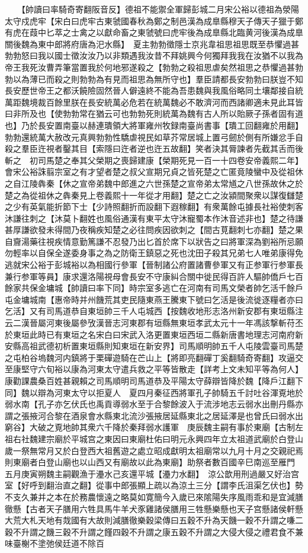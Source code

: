 　　【帥讀曰率騎奇寄翻阪音反】德祖不能禦全軍歸彭城二月宋公裕以德祖為滎陽太守戍虎牢【宋白曰虎牢古東虢國春秋為鄭之制邑漢為成臯縣穆天子傳天子獵于鄭有虎在葭中匕萃之士禽之以獻命畜之東虢號曰虎牢後為成臯縣北臨黄河後漢為成臯關後魏為東中郎將府唐為汜水縣】　夏主勃勃徵隱士京兆韋祖思祖思既至恭懼過甚勃勃怒曰我以國士徵汝汝乃以非類遇我汝昔不拜姚興今何獨拜我我在汝猶不以我為帝王我死汝曹弄筆當置我於何地邪遂殺之【勃勃之殺祖思虐矣然祖思之恭懼過甚勃勃以為薄已而殺之則勃勃為有見而祖思為無所守也】羣臣請都長安勃勃曰朕豈不知長安歷世帝王之都沃饒險固然晉人僻遠終不能為吾患魏與我風俗略同土壤鄰接自統萬距魏境裁百餘里朕在長安統萬必危若在統萬魏必不敢濟河而西諸卿適未見此耳皆曰非所及也【使勃勃常在猶云可也勃勃死則統萬為魏有古人所以貽厥子孫者固有道也】乃於長安置南臺以赫連璝領大將軍雍州牧録南臺尚書事【璝工回翻雍於用翻】勃勃還統萬大赦改元真興勃勃性驕虐視民如草芥常居城上置弓劒於側有所嫌忿手自殺之羣臣迕視者鑿其目【索隱曰迕者逆也迕五故翻】笑者決其脣諫者先截其舌而後斬之　初司馬楚之奉其父榮期之喪歸建康【榮期死見一百一十四卷安帝義熙二年】會宋公裕誅翦宗室之有才望者楚之叔父宣期兄貞之皆死楚之亡匿竟陵蠻中及從祖休之自江陵犇秦【休之宣帝弟魏中郎進之六世孫楚之宣帝弟太常馗之八世孫故休之於楚之為從祖休之犇秦見上卷義熙十一年從才用翻】楚之亡之汝潁間聚衆以謀復讎楚之少有英氣能折節下士【少詩照翻折而設翻下遐稼翻】有衆萬餘屯據長社裕使刺客沐謙往刺之【沐莫卜翻姓也風俗通漢有東平太守沐寵蜀本作沐音述非也】楚之待謙甚厚謙欲發未得間乃夜稱疾知楚之必往問疾因欲刺之【間古莧翻刺七亦翻】楚之果自齎湯藥往視疾情意勤篤謙不忍發乃出匕首於席下以狀告之曰將軍深為劉裕所忌願勿輕率以自保全遂委身事之為之防衛王鎮惡之死也沈田子殺其兄弟七人唯弟康得免逃就宋公裕于彭城裕以為相國行參軍【晉制諸公府置諸曹參軍又有正参軍行参軍長兼行参軍等員】康求還洛陽視母會長安不守康糾合關中徙民得百許人驅帥僑戶七百餘家共保金墉城【帥讀曰率下同】時宗室多逃亡在河南有司馬文榮者帥乞活千餘戶屯金墉城南【惠帝時并州饑荒其吏民隨東燕王騰東下號曰乞活是後流徙逐糧者亦曰乞活】又有司馬道恭自東垣帥三千人屯城西【按魏收地形志洛州新安郡有東垣縣注云二漢晉屬河東後屬參攷漢晉志河東郡有垣縣無東垣孝武太元十一年馮該撃斬苻丕於東垣此時已有東垣之名宋白曰宋武入洛更置東垣西垣二縣新唐書地理志河南府新安縣高祖武德初析置東垣縣則知東垣在新安界】司馬順明帥五千人屯陵雲臺司馬楚之屯柏谷塢魏河内鎮將于栗磾遊騎在芒山上【將即亮翻磾丁奚翻騎奇寄翻】攻逼交至康堅守六旬裕以康為河東太守遣兵救之平等皆散走【詳考上文未知平等為何人】康勸課農桑百姓甚親賴之司馬順明司馬道恭及平陽太守薛辯皆降於魏【降戶江翻下同】魏以辯為河東太守以拒夏人　夏四月秦征西將軍孔子帥騎五千討吐谷渾覔地於弱水南【孔子亦乞伏氏也禹貢導弱水至于合黎餘波入于流涉地志云弱水出刪丹縣亦謂之張掖河合黎在酒泉會水縣東北流沙張掖居延縣東北之居延澤是也曾氏曰弱水出窮谷】大破之覔地帥其衆六千降於秦拜弱水護軍　庚辰魏主嗣有事於東廟【古制左祖右社魏建宗廟於平城宫之東因曰東廟杜佑曰明元永興四年立太祖道武廟於白登山歲一祭無常月又於白登西大祖舊遊之處立昭成獻明太祖廟常以九月十月之交親祀焉則東廟者白登山廟也以山西又有廟故以此為東廟】助祭者數百國辛巳南巡至雁門　五月庚寅朔魏主嗣觀漁于灅水己亥還平城【灅力水翻】　涼公歆用刑過嚴又好治宫室【好呼到翻治直之翻】從事中郎張顯上疏以為涼土三分【謂李氏沮渠乞伏也】勢不支久兼并之本在於務農懷遠之略莫如寛簡今入歲已來隂陽失序風雨乖和是宜減膳徹懸【古者天子膳用六牲具馬牛羊犬豕雞諸侯膳用三牲懸樂懸也天子宫懸諸侯軒懸大荒大札天地有烖國有大故則減膳徹樂穀梁傳曰五穀不升為天饑一穀不升謂之嗛二穀不升謂之饑三穀不升謂之饉四穀不升謂之康五穀不升謂之大侵大侵之禮君食不兼味臺榭不塗弛侯廷道不除百